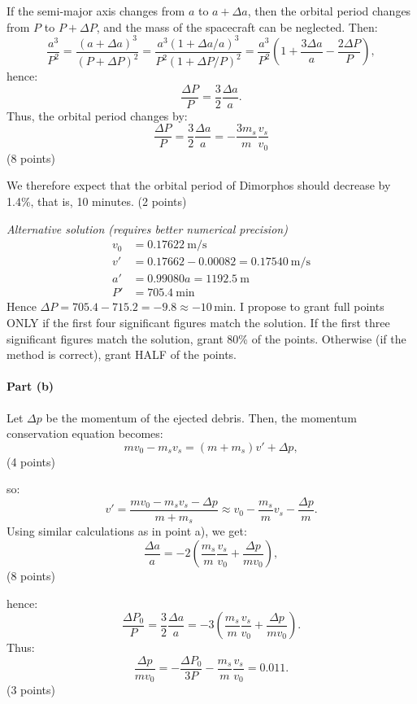 If the semi-major axis changes from $a$ to $a + \Delta a$, then the orbital
period changes from $P$ to $P + \Delta P$, and the mass of the spacecraft can
be neglected. Then:
\[
  \frac{a^3}{P^2} = \frac{(a + \Delta a)^3}{(P + \Delta P)^2}
    = \frac{a^3(1 + \Delta a/a)^3}{P^2(1 + \Delta P/P)^2}
    = \frac{a^3}{P^2}
      \left(1 + \frac{3\Delta a}{a} - \frac{2\Delta P}{P}\right),
\]
hence:
\[
  \frac{\Delta P}{P} = \frac{3}{2}\frac{\Delta a}{a}.
\]
Thus, the orbital period changes by:
\[
  \frac{\Delta P}{P} = \frac{3}{2}\frac{\Delta a}{a}
    = -\frac{3m_s}{m}\frac{v_s}{v_0}
\]
\hfill(8 points)

We therefore expect that the orbital period of Dimorphos should decrease by
1.4\%, that is, 10 minutes. \hfill(2 points)

\medskip
\textit{Alternative solution (requires better numerical precision)}
\begin{align*}
  v_0 &= 0.17622\ \mathrm{m/s} \\
  v' &= 0.17662 - 0.00082 = 0.17540\ \mathrm{m/s} \\ %
  a' &= 0.99080a = 1192.5\ \mathrm{m} \\
  P' &= 705.4\ \mathrm{min}
\end{align*}
Hence $\Delta P = 705.4 - 715.2 = -9.8 \approx -10$\,min. I propose to grant
full points ONLY if the first four significant figures match the solution. If
the first three significant figures match the solution, grant 80\% of the
points. Otherwise (if the method is correct), grant HALF of the points.

\paragraph{Part (b)}

Let $\Delta p$ be the momentum of the ejected debris. Then, the momentum
conservation equation becomes:
\[
  mv_0 - m_s v_s = (m + m_s)v' + \Delta p,
\]
\hfill(4 points)

so:
\[
  v' = \frac{mv_0 - m_s v_s - \Delta p}{m + m_s}
    \approx v_0 - \frac{m_s}{m}v_s - \frac{\Delta p}{m}.
\]
Using similar calculations as in point a), we get:
\[
  \frac{\Delta a}{a}
    = -2\left(\frac{m_s}{m}\frac{v_s}{v_0} + \frac{\Delta p}{mv_0}\right),
\]
\hfill(8 points)

hence:
\[
  \frac{\Delta P_0}{P} = \frac{3}{2}\frac{\Delta a}{a}
    = -3\left(\frac{m_s}{m}\frac{v_s}{v_0} + \frac{\Delta p}{mv_0}\right).
\]
Thus:
\[
  \frac{\Delta p}{mv_0} = -\frac{\Delta P_0}{3P}
    - \frac{m_s}{m}\frac{v_s}{v_0} = 0.011.
\]
\hfill(3 points)

